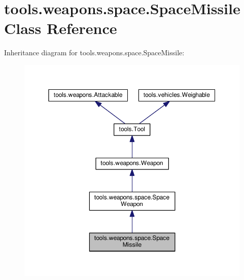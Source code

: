 \hypertarget{classtools_1_1weapons_1_1space_1_1_space_missile}{}\section{tools.\+weapons.\+space.\+Space\+Missile Class Reference}
\label{classtools_1_1weapons_1_1space_1_1_space_missile}


Inheritance diagram for tools.\+weapons.\+space.\+Space\+Missile\+:
\nopagebreak
\begin{figure}[H]
\begin{center}
\leavevmode
\includegraphics[width=350pt]{classtools_1_1weapons_1_1space_1_1_space_missile__inherit__graph}
\end{center}
\end{figure}


